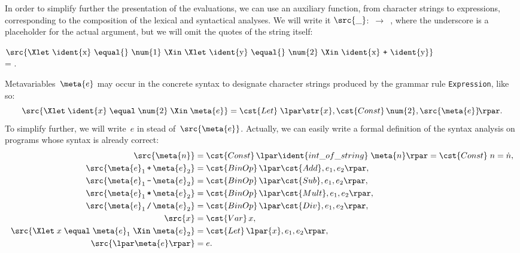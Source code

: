 In order to simplify further the presentation of the evaluations, we
can use an auxiliary function, from character strings to expressions,
corresponding to the composition of the lexical and syntactical
analyses. We will write it \mbox{$\src{\_}$: 
  $\rightarrow$ }, where the underscore is a placeholder
for the actual argument, but we will omit the quotes of the string
itself:

\medskip

\noindent $\src{\text{\Xlet \ident{x} \equal{} \num{1} \Xin \Xlet
  \ident{y} \equal{} \num{2} \Xin \ident{x} \texttt{+} \ident{y}}}$\\
= .

\medskip

Metavariables~$\meta{e}$ may occur in the concrete syntax to designate
character strings produced by the grammar rule \texttt{Expression},
like so:
\begin{equation*}
\src{\Xlet \; \ident{x} \; \equal \; \num{2} \; \Xin \; \meta{e}} =
\cst{Let} \; \lpar\str{x}, \cst{Const} \, \num{2},
\src{\meta{e}}\!\rpar.
\end{equation*}
To simplify further, we will write~$e$ in stead
of~$\src{\meta{e}}$. Actually, we can easily write a formal
definition of the syntax analysis on programs whose syntax is already
correct:
\begin{align*}
\src{\meta{n}} & = \cst{Const} \, \lpar\ident{int\_of\_string} \;
\meta{n}\rpar = \cst{Const} \; n = \dot{n},\\
\src{\meta{e}_1 \, \texttt{+} \, \meta{e}_2} & = \cst{BinOp} \,
\lpar\cst{Add}, e_1, e_2\rpar,\\
\src{\meta{e}_1 \, \texttt{-} \, \meta{e}_2} & = \cst{BinOp} \,
\lpar\cst{Sub}, e_1, e_2\rpar,\\
\src{\meta{e}_1 \, \texttt{*} \, \meta{e}_2} & = \cst{BinOp} \,
\lpar\cst{Mult}, e_1, e_2\rpar,\\
\src{\meta{e}_1 \, \texttt{/} \, \meta{e}_2} & = \cst{BinOp} \,
\lpar\cst{Div}, e_1, e_2\rpar,\\
\src{x} & = \cst{Var} \, x,\\
\src{\Xlet \; x \; \equal \; \meta{e}_1 \; \Xin \;
  \meta{e}_2} & = \cst{Let} \, \lpar{x}, e_1, e_2\rpar,\\
\src{\lpar\meta{e}\rpar} & = e.
\end{align*}

